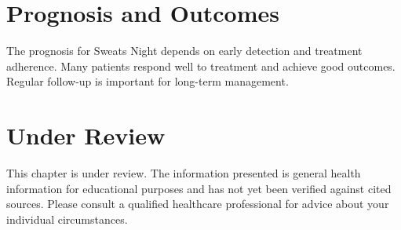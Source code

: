 \section*{Prognosis and Outcomes}
The prognosis for Sweats Night depends on early detection and treatment adherence. Many patients respond well to treatment and achieve good outcomes. Regular follow-up is important for long-term management.
\section*{Under Review}
This chapter is under review. The information presented is general health information for educational purposes and has not yet been verified against cited sources. Please consult a qualified healthcare professional for advice about your individual circumstances.


\clearpage
